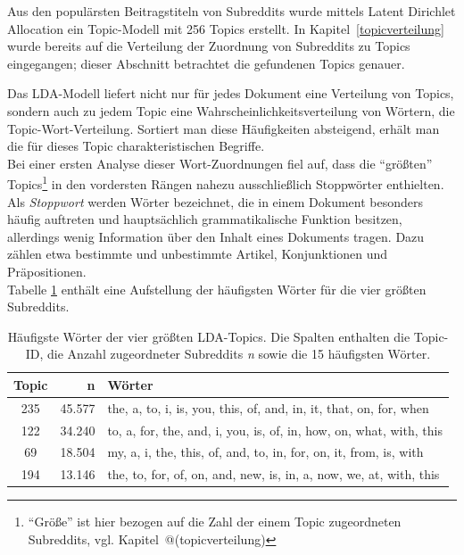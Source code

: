 \documentclass[11pt,a4paper,twoside]{article}
\let\rmarkdownfootnote\footnote%
\def\footnote{\protect\rmarkdownfootnote}
\begin{document}
Aus den populärsten Beitragstiteln von Subreddits wurde mittels Latent
Dirichlet Allocation ein Topic-Modell mit 256 Topics erstellt. In
Kapitel~\ref{topicverteilung} wurde bereits auf die Verteilung der
Zuordnung von Subreddits zu Topics eingegangen; dieser Abschnitt
betrachtet die gefundenen Topics genauer.

Das LDA-Modell liefert nicht nur für jedes Dokument eine Verteilung von
Topics, sondern auch zu jedem Topic eine Wahrscheinlichkeitsverteilung
von Wörtern, die Topic-Wort-Verteilung. Sortiert man diese Häufigkeiten
absteigend, erhält man die für dieses Topic charakteristischen
Begriffe.\\
Bei einer ersten Analyse dieser Wort-Zuordnungen fiel auf, dass die
\enquote{größten} Topics\footnote{\enquote{Größe} ist hier bezogen auf
  die Zahl der einem Topic zugeordneten Subreddits, vgl.
  Kapitel~@(topicverteilung)} in den vordersten Rängen nahezu
ausschließlich Stoppwörter enthielten. Als \emph{Stoppwort} werden
Wörter bezeichnet, die in einem Dokument besonders häufig auftreten und
hauptsächlich grammatikalische Funktion besitzen, allerdings wenig
Information über den Inhalt eines Dokuments tragen. Dazu zählen etwa
bestimmte und unbestimmte Artikel, Konjunktionen und Präpositionen.\\
Tabelle \ref{tab:topics-with-stopwords} enthält eine Aufstellung der
häufigsten Wörter für die vier größten Subreddits.





\begin{table}

\caption{\label{tab:topics-with-stopwords}Häufigste Wörter der vier größten
LDA-Topics. Die Spalten enthalten die Topic-ID, die Anzahl zugeordneter
Subreddits \emph{n} sowie die 15 häufigsten Wörter.}
\centering
\begin{tabular}[t]{crl}
\toprule
Topic & n & Wörter\\
\midrule
235 & 45.577 & the, a, to, i, is, you, this, of, and, in, it, that, on, for, when\\
122 & 34.240 & to, a, for, the, and, i, you, is, of, in, how, on, what, with, this\\
69 & 18.504 & my, a, i, the, this, of, and, to, in, for, on, it, from, is, with\\
194 & 13.146 & the, to, for, of, on, and, new, is, in, a, now, we, at, with, this\\
\bottomrule
\end{tabular}
\end{table}
\end{document}
